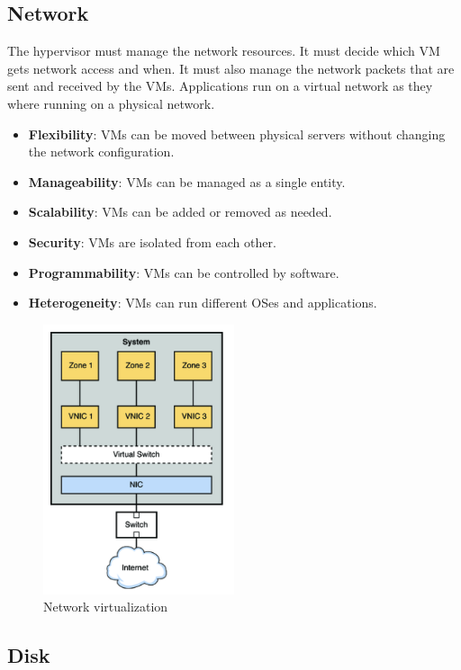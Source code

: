 \subsection{Network}

The hypervisor must manage the network resources. It must decide which VM gets network access and when. It must also manage the network packets that are sent and received by the VMs. Applications run on a virtual network as they
where running on a physical network.

\begin{itemize}
    \item \textbf{Flexibility}: VMs can be moved between physical servers without changing the network configuration.
    \item \textbf{Manageability}: VMs can be managed as a single entity.
    \item \textbf{Scalability}: VMs can be added or removed as needed.
    \item \textbf{Security}: VMs are isolated from each other.
    \item \textbf{Programmability}: VMs can be controlled by software.
    \item \textbf{Heterogeneity}: VMs can run different OSes and applications.
\end{itemize}

\begin{figure}[H]
    \centering
    \includegraphics[width=0.5\textwidth]{assets/fig32.png}
    \caption{Network virtualization}
\end{figure}

\subsection{Disk}

